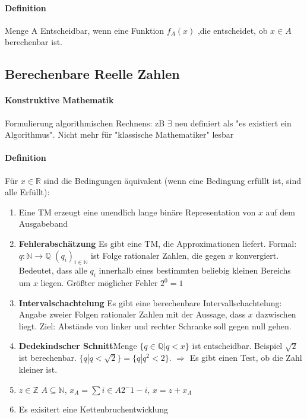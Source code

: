 \documentclass[ngerman]{scrartcl}
\begin{document}
\paragraph{Definition}
 Menge A Entscheidbar, wenn eine Funktion $ f_{A}(x) $ ,die entscheidet, ob $ x \in A $ berechenbar ist.

\subsection{Berechenbare Reelle Zahlen}

\paragraph{Konstruktive Mathematik}
Formulierung algorithmischen Rechnens: zB $ \exists $ neu definiert als "es existiert ein Algorithmus". Nicht mehr für "klassische Mathematiker" lesbar

\paragraph{Definition}
Für $ x \in \mathbb{R} $ sind die Bedingungen äquivalent (wenn eine Bedingung erfüllt ist, sind alle Erfüllt):
\begin{enumerate}
  \item Eine TM erzeugt eine unendlich lange binäre Representation von $ x $ auf dem Ausgabeband
  \item \textbf{Fehlerabschätzung} Es gibt eine TM, die Approximationen liefert. Formal: $ q:\mathbb{N}\rightarrow \mathbb{Q} $ $ (q_{i})_{i \in \mathbb{N}} $ ist Folge rationaler Zahlen, die gegen $ x $ konvergiert. Bedeutet, dass alle $ q_i $ innerhalb eines bestimmten beliebig kleinen Bereichs um $ x $ liegen. Größter möglicher Fehler $ 2^0 = 1 $
  \item \textbf{Intervalschachtelung} Es gibt eine berechenbare Intervallschachtelung: Angabe zweier Folgen rationaler Zahlen mit der Aussage, dass $ x $ dazwischen liegt. Ziel: Abstände von linker und rechter Schranke soll gegen null gehen.
  \item \textbf{Dedekindscher Schnitt}Menge $ \{q \in \mathbb{Q} | q < x \} $ ist entscheidbar. Beispiel $ \sqrt{2} $ ist berechenbar. $ \{ q | q < \sqrt{2} \} = \{ q | q^2 < 2\}$. $ \Rightarrow $ Es gibt einen Test, ob die Zahl kleiner ist.
  \item $ z \in \mathbb{Z} $ $ A \subseteq \mathbb{N} $, $ x_A = \sum{i \in A} 2^-1-i $, $ x = z + x_A $
  \item Es exisitert eine Kettenbruchentwicklung
 \end{enumerate}
\end{document}
